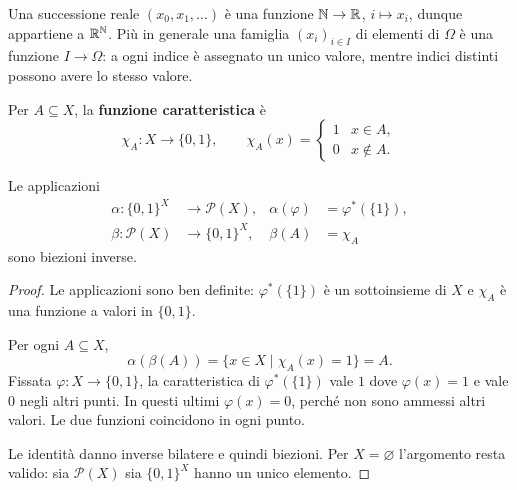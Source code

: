 Una successione reale $(x_0,x_1,\ldots)$ è una funzione $\mathbb{N}\to\mathbb{R}$, $i\mapsto x_i$, dunque appartiene a $\mathbb{R}^{\mathbb{N}}$. Più in generale una famiglia $(x_i)_{i\in I}$ di elementi di $\Omega$ è una funzione $I\to\Omega$: a ogni indice è assegnato un unico valore, mentre indici distinti possono avere lo stesso valore.

\begin{definizione}
Per $A\subseteq X$, la \textbf{funzione caratteristica} è
\[
\chi_A:X\to\{0,1\},\qquad \chi_A(x)=\begin{cases}1&x\in A,\\0&x\notin A.\end{cases}
\]
\end{definizione}

\begin{teorema}\label{teo:caratteristiche}
Le applicazioni
\[
\begin{aligned}
\alpha:\{0,1\}^X&\to\mathcal P(X),&\alpha(\varphi)&=\varphi^*(\{1\}),\\
\beta:\mathcal P(X)&\to\{0,1\}^X,&\beta(A)&=\chi_A
\end{aligned}
\]
sono biezioni inverse.
\end{teorema}
\begin{proof}
Le applicazioni sono ben definite: $\varphi^*(\{1\})$ è un sottoinsieme di $X$ e $\chi_A$ è una funzione a valori in $\{0,1\}$.

 Per ogni $A\subseteq X$,
\[
\alpha(\beta(A))=\{x\in X\mid\chi_A(x)=1\}=A.
\]
 Fissata $\varphi:X\to\{0,1\}$, la caratteristica di $\varphi^*(\{1\})$ vale $1$ dove $\varphi(x)=1$ e vale $0$ negli altri punti. In questi ultimi $\varphi(x)=0$, perché non sono ammessi altri valori. Le due funzioni coincidono in ogni punto.

Le identità danno inverse bilatere e quindi biezioni. Per $X=\varnothing$ l'argomento resta valido: sia $\mathcal P(X)$ sia $\{0,1\}^X$ hanno un unico elemento.
\end{proof}
